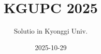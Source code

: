 \documentclass[11pt]{article}
\title{KGUPC 2025}
\author{Solutio in Kyonggi Univ.}
\date{2025-10-29}
\begin{document}
\problemsetfrontmatter

\checkselectedproblem
\end{document}
